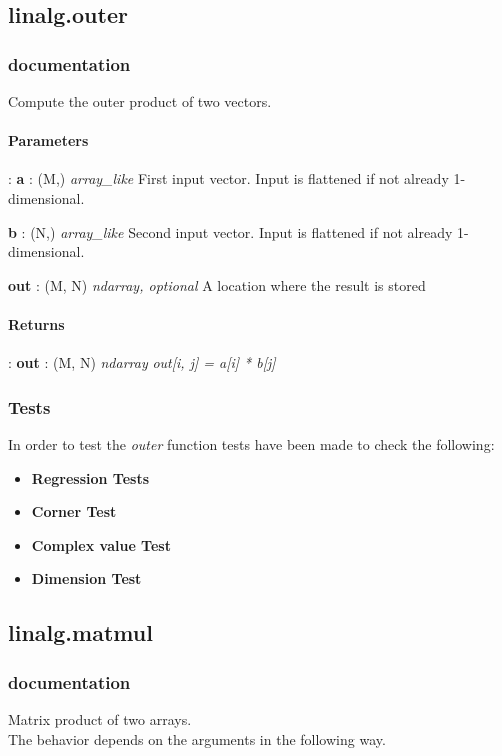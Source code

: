 \documentclass[a4paper,11pt]{article}
\begin{document}
\subsection{linalg.outer}
\subsubsection{documentation}
Compute the outer product of two vectors.

\paragraph{Parameters}:	
\textbf{a} : (M,) \textit{array\_like} First input vector. Input is flattened if not already 1-dimensional.

\textbf{b} : (N,) \textit{array\_like} Second input vector. Input is flattened if not already 1-dimensional.

\textbf{out} : (M, N) \textit{ndarray, optional} A location where the result is stored

\paragraph{Returns}: \textbf{out} : (M, N) \textit{ndarray} \textit{out[i, j] = a[i] * b[j]}


\subsubsection{Tests}

In order to test the \textit{outer} function tests have been made to check the following:

\begin{itemize}
	\item \textbf{Regression Tests}
	\item \textbf{Corner Test}
	\item \textbf{Complex value Test}
	\item \textbf{Dimension Test}
\end{itemize}

\subsection{linalg.matmul}
\subsubsection{documentation}
Matrix product of two arrays.\\ The behavior depends on the arguments in the following way.\\
\end{document}
